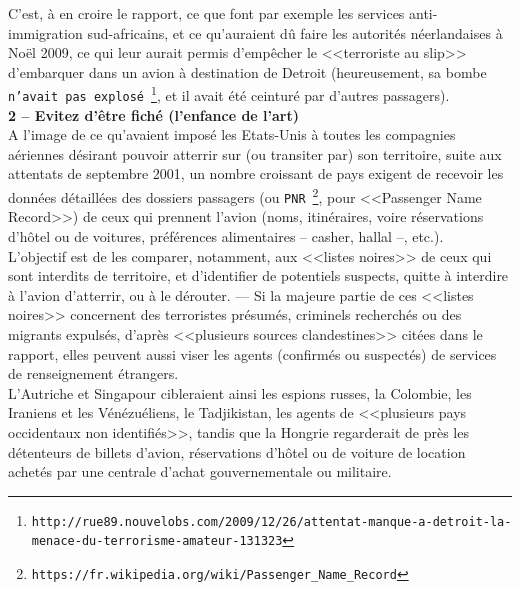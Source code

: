 \documentclass[11pt,twoside,a4paper]{article}
\begin{document}
C'est, {\`a} en croire le rapport, ce que font par exemple les services anti-immigration sud-africains, et ce qu'auraient d{\^u} faire les autorit{\'e}s n{\'e}erlandaises {\`a} Noël 2009, ce qui leur aurait permis d'emp{\^e}cher le <<terroriste au slip>> d'embarquer dans un avion {\`a} destination de Detroit (heureusement, sa bombe \texttt{n'avait pas explos{\'e}}~\footnote{\texttt{http://rue89.nouvelobs.com/2009/12/26/attentat-manque-a-detroit-la-menace-du-terrorisme-amateur-131323}}, et il avait {\'e}t{\'e} ceintur{\'e} par d'autres passagers). ~\\

\textbf{\large 2 -- Evitez d'{\^e}tre fich{\'e} (l'enfance de l'art)}~\\

A l'image de ce qu'avaient impos{\'e} les Etats-Unis {\`a} toutes les compagnies a{\'e}riennes d{\'e}sirant pouvoir atterrir sur (ou transiter par) son territoire, suite aux attentats de septembre 2001, un nombre croissant de pays exigent de recevoir les donn{\'e}es d{\'e}taill{\'e}es des dossiers passagers (ou \texttt{PNR}~\footnote{\texttt{https://fr.wikipedia.org/wiki/Passenger\_Name\_Record}}, pour <<Passenger Name Record>>) de ceux qui prennent l'avion (noms, itin{\'e}raires, voire r{\'e}servations d'h{\^o}tel ou de voitures, pr{\'e}f{\'e}rences alimentaires -- casher, hallal –, etc.). ~\\

L'objectif est de les comparer, notamment, aux <<listes noires>> de ceux qui sont interdits de territoire, et d'identifier de potentiels suspects, quitte {\`a} interdire {\`a} l'avion d'atterrir, ou {\`a} le d{\'e}router. --- Si la majeure partie de ces <<listes noires>> concernent des terroristes pr{\'e}sum{\'e}s, criminels recherch{\'e}s ou des migrants expuls{\'e}s, d'apr{\`e}s <<plusieurs sources clandestines>> cit{\'e}es dans le rapport, elles peuvent aussi viser les agents (confirm{\'e}s ou suspect{\'e}s) de services de renseignement {\'e}trangers. ~\\

L'Autriche et Singapour cibleraient ainsi les espions russes, la Colombie, les Iraniens et les V{\'e}n{\'e}zu{\'e}liens, le Tadjikistan, les agents de <<plusieurs pays occidentaux non identifi{\'e}s>>, tandis que la Hongrie regarderait de pr{\`e}s les d{\'e}tenteurs de billets d'avion, r{\'e}servations d'h{\^o}tel ou de voiture de location achet{\'e}s par une centrale d'achat gouvernementale ou militaire. ~\\
\end{document}
